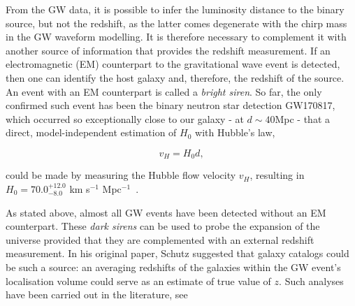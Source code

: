 From the GW data, it is possible to infer the luminosity distance to the binary source, but not the redshift, as the latter comes degenerate with the chirp mass in the GW waveform modelling. It is therefore necessary to complement it with another source of information that provides the redshift measurement. If an electromagnetic (EM) counterpart to the gravitational wave event is detected, then one can identify the host galaxy and, therefore, the redshift of the source. An event with an EM counterpart is called a \textit{bright siren}. So far, the only confirmed such event has been the binary neutron star detection GW170817, which occurred so exceptionally close to our galaxy  - at $d \sim 40$Mpc - that a direct, model-independent estimation of $H_0$ with Hubble's law,

\begin{equation}
    v_H = H_0 d,
\end{equation}

could be made by measuring the Hubble flow velocity $v_H$, resulting in $H_0 = 70.0^{+12.0}_{-8.0}$ km s$^{-1}$ Mpc$^{-1}$~\cite{LIGOScientific:2017adf}.

As stated above, almost all GW events have been detected without an EM counterpart. These \textit{dark sirens} can be used to probe the expansion of the universe provided that they are complemented with an external redshift measurement. In his original paper, Schutz suggested that galaxy catalogs could be such a source: an averaging redshifts of the galaxies within the GW event's localisation volume could serve as an estimate of true value of $z$. Such analyses have been carried out in the literature, see~\onlinecite{}

